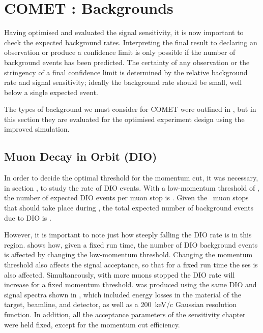 
\chapter{COMET \phaseII: Backgrounds}
Having optimised and evaluated the signal sensitivity, it is now important to check the expected background rates.
Interpreting the final result to declaring an observation or produce a confidence limit is only possible if the number of background events has been predicted.
The certainty of any observation or the stringency of a final confidence limit is determined by the relative background rate and signal sensitivity; ideally the background rate should be small, well below a single expected event.

The types of background we must consider for COMET were outlined in , but in this section they are evaluated for the optimised experiment design using the improved simulation.

\FigDIOBackground
\section{Muon Decay in Orbit (\acs{DIO})}
In order to decide the optimal threshold for the momentum cut, it was necessary, in section , to study the rate of \ac{DIO} events.
With a low-momentum threshold of \VarMomThreshold, the number of expected DIO events per muon stop is \VarDIOPerMuStop{}.
Given the \VarTotalMuStops~muon stops that should take place during \phaseII, the total expected number of background events due to DIO is \VarDIOTotal.

However, it is important to note just how steeply falling the DIO rate is in this region.
 shows how, given a fixed run time, the number of DIO background events is affected by changing the low-momentum threshold.
Changing the momentum threshold also affects the signal acceptance, so that for a fixed run time the \ac{ses} is also affected.
Simultaneously, with more muons stopped the \ac{DIO} rate will increase for a fixed momentum threshold.
 was produced using the same DIO and signal spectra shown in , which included energy losses in the material of the target, beamline, and detector, as well as a 200~keV/c Gaussian resolution function. 
In addition, all the acceptance parameters of the sensitivity chapter were held fixed, except for the momentum cut efficiency.

